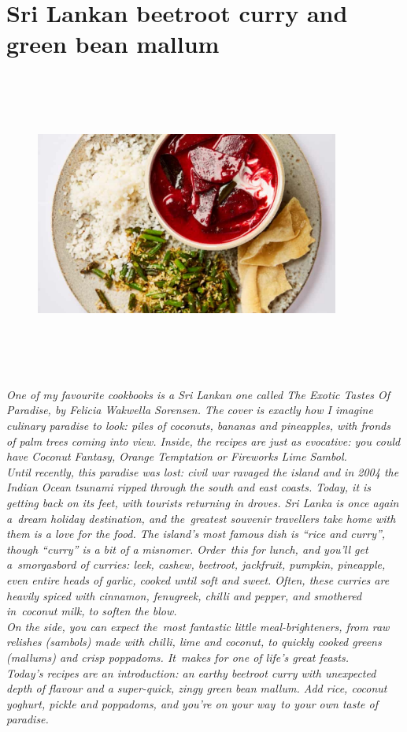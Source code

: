 \documentclass{book}
\begin{document}
\section{Sri Lankan beetroot curry and green bean mallum}
\begin{figure}
\centering\includegraphics[width=10cm,height=10cm,keepaspectratio]{Recipe_Pictures/Sri_Lankan_beetroot_curry_and_green_bean_mallum.png}
\end{figure}
\emph{One of my favourite cookbooks is a Sri Lankan one called The Exotic Tastes Of Paradise, by Felicia Wakwella Sorensen. The cover is exactly how I imagine culinary paradise to look: piles of coconuts, bananas and pineapples, with fronds of palm trees coming into view. Inside, the recipes are just as evocative: you could have Coconut Fantasy, Orange Temptation or Fireworks Lime Sambol.\\ 
Until recently, this paradise was lost: civil war ravaged the island and in 2004 the Indian Ocean tsunami ripped through the south and east coasts. Today, it is getting back on its feet, with tourists returning in droves. Sri Lanka is once again a dream holiday destination, and the greatest souvenir travellers take home with them is a love for the food. The island’s most famous dish is “rice and curry”, though “curry” is a bit of a misnomer. Order this for lunch, and you’ll get a smorgasbord of curries: leek, cashew, beetroot, jackfruit, pumpkin, pineapple, even entire heads of garlic, cooked until soft and sweet. Often, these curries are heavily spiced with cinnamon, fenugreek, chilli and pepper, and smothered in coconut milk, to soften the blow.\\ 
On the side, you can expect the most fantastic little meal-brighteners, from raw relishes (sambols) made with chilli, lime and coconut, to quickly cooked greens (mallums) and crisp poppadoms. It makes for one of life’s great feasts.\\ 
Today’s recipes are an introduction: an earthy beetroot curry with unexpected depth of flavour and a super-quick, zingy green bean mallum. Add rice, coconut yoghurt, pickle and poppadoms, and you’re on your way to your own taste of paradise.}\\\\ 
\end{document}

